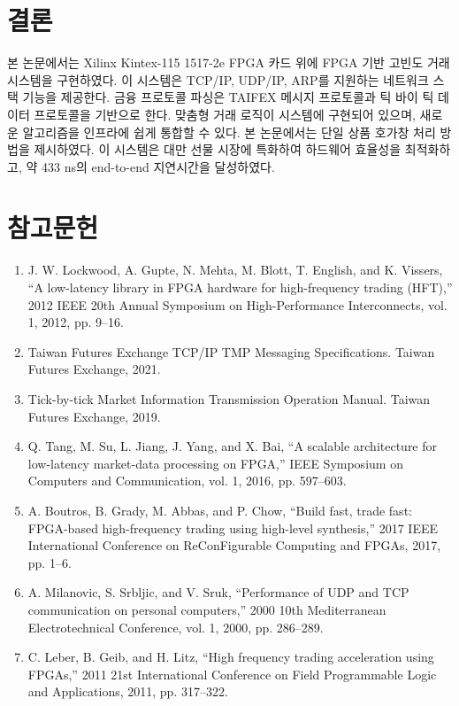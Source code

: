 \documentclass[11pt,a4paper]{article}
\begin{document}
\section{결론}
본 논문에서는 Xilinx Kintex-115 1517-2e FPGA 카드 위에 FPGA 기반 고빈도 거래 시스템을 구현하였다. 이 시스템은 TCP/IP, UDP/IP, ARP를 지원하는 네트워크 스택 기능을 제공한다. 금융 프로토콜 파싱은 TAIFEX 메시지 프로토콜과 틱 바이 틱 데이터 프로토콜을 기반으로 한다. 맞춤형 거래 로직이 시스템에 구현되어 있으며, 새로운 알고리즘을 인프라에 쉽게 통합할 수 있다. 본 논문에서는 단일 상품 호가창 처리 방법을 제시하였다. 이 시스템은 대만 선물 시장에 특화하여 하드웨어 효율성을 최적화하고, 약 433 ns의 end-to-end 지연시간을 달성하였다.

\section*{참고문헌}
\begin{enumerate}
    \item J. W. Lockwood, A. Gupte, N. Mehta, M. Blott, T. English, and K. Vissers, ``A low-latency library in FPGA hardware for high-frequency trading (HFT),'' 2012 IEEE 20th Annual Symposium on High-Performance Interconnects, vol. 1, 2012, pp. 9--16.
    \item Taiwan Futures Exchange TCP/IP TMP Messaging Specifications. Taiwan Futures Exchange, 2021.
    \item Tick-by-tick Market Information Transmission Operation Manual. Taiwan Futures Exchange, 2019.
    \item Q. Tang, M. Su, L. Jiang, J. Yang, and X. Bai, ``A scalable architecture for low-latency market-data processing on FPGA,'' IEEE Symposium on Computers and Communication, vol. 1, 2016, pp. 597--603.
    \item A. Boutros, B. Grady, M. Abbas, and P. Chow, ``Build fast, trade fast: FPGA-based high-frequency trading using high-level synthesis,'' 2017 IEEE International Conference on ReConFigurable Computing and FPGAs, 2017, pp. 1--6.
    \item A. Milanovic, S. Srbljic, and V. Sruk, ``Performance of UDP and TCP communication on personal computers,'' 2000 10th Mediterranean Electrotechnical Conference, vol. 1, 2000, pp. 286--289.
    \item C. Leber, B. Geib, and H. Litz, ``High frequency trading acceleration using FPGAs,'' 2011 21st International Conference on Field Programmable Logic and Applications, 2011, pp. 317--322.
\end{enumerate}
\end{document}
